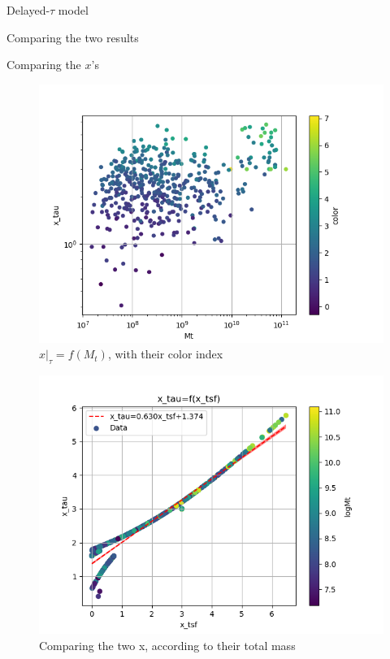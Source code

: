 \documentclass[presentation]{beamer}
\begin{document}
\begin{frame}[label={sec:org05089e9}]{Delayed-\(\tau\) model}
\begin{block}{Comparing the two results}
\begin{block}{Comparing the \(x\)'s}
\begin{figure}[!htpb]
\centering
\includegraphics[width=.9\linewidth]{./figs/x_tau-Mt-color.png}
\caption{\label{fig:$x|_\tau=f(M_t)$, with their color index}\(x|_\tau=f(M_t)\), with their color index}
\end{figure}



\begin{figure}[!htpb]
\centering
\includegraphics[width=.9\linewidth]{./figs/x_tsf-x_tau-color_logMt.png}
\caption{\label{fig:Comparing the two x, according to their total mass}Comparing the two x, according to their total mass}
\end{figure}



\end{block}
\end{block}
\end{frame}
\end{document}
